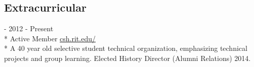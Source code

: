 \documentclass[letter,margin,line]{resume}
\newcommand{\rurl}[1]{\hfill {\footnotesize \url{#1}}}
\newcommand{\rdate}[1]{\hfill {\small #1}}
\renewcommand{\employer}[6]{\item[#1] - #2 \rdate{#3} \\* #4 \rurl{#5}\\* #6}
\begin{document}
\begin{resume}
        \section{\mysidestyle Extracurricular}
        \begin{asparadesc}
            \employer{Computer Science House ({\small CSH})}
                     {}
                     {2012 - Present}
                     {Active Member}
                     {csh.rit.edu/}
                     {A 40 year old selective student technical organization,
                      emphasizing technical projects and group learning.
                      Elected History Director (Alumni Relations) 2014.
                     }
        \end{asparadesc}
    \end{resume}
    
\end{document}
